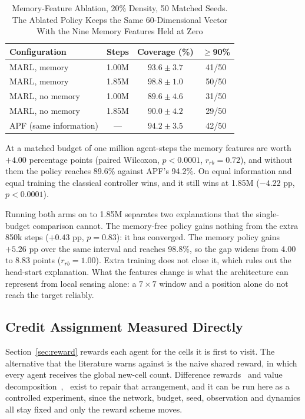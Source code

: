 \documentclass[a4paper, 10pt, conference]{ieeeconf}
\begin{document}
\begin{table}[htb]
\centering
\caption{Memory-Feature Ablation, 20\% Density, 50 Matched Seeds. The
Ablated Policy Keeps the Same 60-Dimensional Vector With the Nine
Memory Features Held at Zero}
\label{tab:ablation}
\scriptsize
\setlength{\tabcolsep}{3pt}
\begin{tabular}{lccc}
\toprule
\textbf{Configuration} & \textbf{Steps} & \textbf{Coverage (\%)} &
\textbf{$\geq$90\%} \\
\midrule
MARL, memory     & 1.00M & $93.6\pm3.7$ & 41/50 \\
MARL, memory     & 1.85M & $98.8\pm1.0$ & 50/50 \\
MARL, no memory  & 1.00M & $89.6\pm4.6$ & 31/50 \\
MARL, no memory  & 1.85M & $90.0\pm4.2$ & 29/50 \\
APF (same information) & --- & $94.2\pm3.5$ & 42/50 \\
\bottomrule
\end{tabular}
\end{table}

At a matched budget of one million agent-steps the memory features are
worth $+4.00$ percentage points (paired Wilcoxon, $p<0.0001$,
$r_{rb}=0.72$), and without them the policy reaches 89.6\% against
APF's 94.2\%. On equal information and equal training the classical
controller wins, and it still wins at 1.85M ($-4.22$ pp, $p<0.0001$).

Running both arms on to 1.85M separates two explanations that the
single-budget comparison cannot. The memory-free policy gains nothing
from the extra 850k steps ($+0.43$ pp, $p=0.83$): it has converged. The
memory policy gains $+5.26$ pp over the same interval and reaches
98.8\%, so the gap widens from 4.00 to 8.83 points
($r_{rb}=1.00$). Extra training does not close it, which rules out the
head-start explanation. What the features change is what the
architecture can represent from local sensing alone: a $7\times7$
window and a position alone do not reach the target reliably.

\subsection{Credit Assignment Measured Directly}
\label{sec:credit}

Section~\ref{sec:reward} rewards each agent for the cells it is first
to visit. The alternative that the literature warns against is the
naive shared reward, in which every agent receives the global new-cell
count. Difference rewards~\cite{foerster2018} and value
decomposition~\cite{sunehag2018},~\cite{rashid2018} exist to repair
that arrangement, and it can be run here as a controlled experiment,
since the network, budget, seed, observation and dynamics all stay
fixed and only the reward scheme moves.
\end{document}
